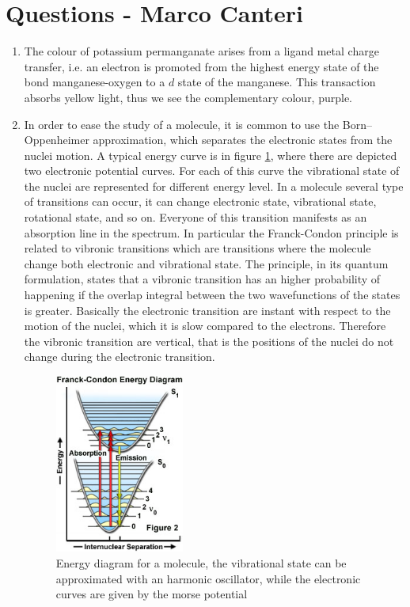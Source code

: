 \documentclass[a4paper,10pt]{article}
\begin{document}
\section{Questions - Marco Canteri}
\begin{enumerate}[label=\alph*)]
	\item The colour of potassium permanganate arises from a ligand metal charge transfer, i.e. an electron is promoted from the highest energy state of the bond manganese-oxygen to a $d$ state of the manganese. This transaction absorbs yellow light, thus we see the complementary colour, purple.
	\item In order to ease the study of a molecule, it is common to use the Born–Oppenheimer approximation, which separates the electronic states from the nuclei motion. A typical energy curve is in figure \ref{frank}, where there are depicted two electronic potential curves. For each of this curve the vibrational state of the nuclei are represented for different energy level. In a molecule several type of transitions can occur, it can change electronic state, vibrational state, rotational state, and so on. Everyone of this transition manifests as an absorption line in the spectrum. In particular the Franck-Condon principle is related to vibronic transitions which are transitions where the molecule change both electronic and vibrational state. The principle, in its quantum formulation, states that a vibronic transition has an higher probability of happening if the overlap integral between the two wavefunctions of the states is greater. Basically the electronic transition are instant with respect to the motion of the nuclei, which it is slow compared to the electrons. Therefore the vibronic transition are vertical, that is the positions of the nuclei do not change during the electronic transition.
	\begin{figure}[H]
	\centering
	\includegraphics[width=0.4\textwidth]{frank.jpg}
	\caption{Energy diagram for a molecule, the vibrational state can be approximated with an harmonic oscillator, while the electronic curves are given by the morse potential}\label{frank}
	\end{figure}


\end{enumerate}
\end{document}
